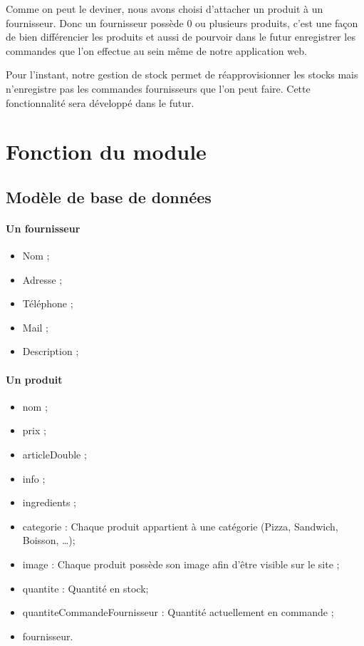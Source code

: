 \documentclass[twoside,UTF8]{EPURapport}
\begin{document}
Comme on peut le deviner, nous avons choisi d'attacher un produit à un fournisseur. Donc un fournisseur possède 0 ou plusieurs produits, c'est une façon de bien différencier les produits et aussi de pourvoir dans le futur enregistrer les commandes que l'on effectue au sein même de notre application web.

Pour l'instant, notre gestion de stock permet de réapprovisionner les stocks mais n'enregistre pas les commandes fournisseurs que l'on peut faire. Cette fonctionnalité sera développé dans le futur.

\section{Fonction du module}
    \subsection{Modèle de base de données}
\paragraph{Un fournisseur}
\begin{itemize}
    \item Nom ;
    \item Adresse ;
    \item Téléphone ;
    \item Mail ;
    \item Description ;
\end{itemize}

\paragraph{Un produit}
\begin{itemize}
        \item nom ;
        \item prix ;
        \item articleDouble ;
        \item info ;
        \item ingredients ;
        \item categorie : Chaque produit appartient à une catégorie (Pizza, Sandwich, Boisson, \ldots);
        \item image : Chaque produit possède son image afin d'être visible sur le site ;
        \item quantite : Quantité en stock;
        \item quantiteCommandeFournisseur : Quantité actuellement en commande ;
        \item fournisseur.
\end{itemize}
\end{document}
